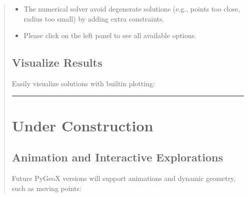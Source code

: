 \documentclass[letterpaper,10pt,english]{sphinxmanual}
\begin{document}
\begin{quote}
\begin{sphinxVerbatim}[commandchars=\\\{\}]
\end{sphinxVerbatim}
\begin{itemize}
\item {} 
\sphinxAtStartPar
The numerical solver avoid degenerate solutions (e.g., points too close, radius too small) by adding extra constraints.

\item {} 
\sphinxAtStartPar
Please click  on the left panel to see all available options.

\end{itemize}


\section{Visualize Results}
\label{\detokenize{index:visualize-results}}
\sphinxAtStartPar
Easily visualize solutions with built\sphinxhyphen{}in plotting:

\begin{sphinxVerbatim}[commandchars=\\\{\}]
\end{sphinxVerbatim}


\bigskip\hrule\bigskip



\chapter{Under Construction}
\label{\detokenize{index:under-construction}}

\section{Animation and Interactive Explorations}
\label{\detokenize{index:animation-and-interactive-explorations}}
\sphinxAtStartPar
Future PyGeoX versions will support animations and dynamic geometry, such as moving points:

\begin{sphinxVerbatim}[commandchars=\\\{\}]
  
\end{sphinxVerbatim}



\end{quote}
\end{document}
